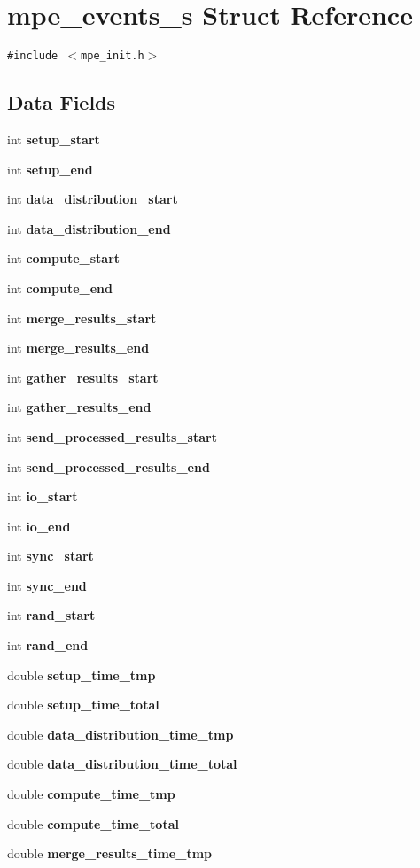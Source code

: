\section{mpe\_\-events\_\-s Struct Reference}
\label{structmpe__events__s}
{\tt \#include $<$mpe\_\-init.h$>$}

\subsection*{Data Fields}
\begin{CompactItemize}
\item 
int \bf{setup\_\-start}
\item 
int \bf{setup\_\-end}
\item 
int \bf{data\_\-distribution\_\-start}
\item 
int \bf{data\_\-distribution\_\-end}
\item 
int \bf{compute\_\-start}
\item 
int \bf{compute\_\-end}
\item 
int \bf{merge\_\-results\_\-start}
\item 
int \bf{merge\_\-results\_\-end}
\item 
int \bf{gather\_\-results\_\-start}
\item 
int \bf{gather\_\-results\_\-end}
\item 
int \bf{send\_\-processed\_\-results\_\-start}
\item 
int \bf{send\_\-processed\_\-results\_\-end}
\item 
int \bf{io\_\-start}
\item 
int \bf{io\_\-end}
\item 
int \bf{sync\_\-start}
\item 
int \bf{sync\_\-end}
\item 
int \bf{rand\_\-start}
\item 
int \bf{rand\_\-end}
\item 
double \bf{setup\_\-time\_\-tmp}
\item 
double \bf{setup\_\-time\_\-total}
\item 
double \bf{data\_\-distribution\_\-time\_\-tmp}
\item 
double \bf{data\_\-distribution\_\-time\_\-total}
\item 
double \bf{compute\_\-time\_\-tmp}
\item 
double \bf{compute\_\-time\_\-total}
\item 
double \bf{merge\_\-results\_\-time\_\-tmp}
\item 

\end{CompactItemize}
